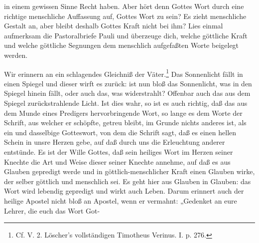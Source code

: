 in einem gewissen Sinne Recht haben. Aber hört denn Gottes Wort durch eine richtige menschliche Auffassung auf, Gottes Wort zu sein? Es zieht menschliche Gestalt an, aber bleibt deshalb Gottes Kraft nicht bei ihm? Lies einmal aufmerksam die Pastoralbriefe Pauli und überzeuge dich, welche göttliche Kraft und welche göttliche Segnungen dem menschlich aufgefaßten Worte beigelegt werden.

Wir erinnern an ein schlagendes Gleichniß der Väter.\footnote{Cf. V. 2. Löscher’s vollständigen Timotheus Verinus. I. p. 276.} Das Sonnenlicht fällt in einen Spiegel und dieser wirft es zurück: ist nun bloß das Sonnenlicht, was in den Spiegel hinein fällt, oder auch das, was widerstrahlt? Offenbar auch das aus dem Spiegel zurückstrahlende Licht. Ist dies wahr, so ist es auch richtig, daß das aus dem Munde eines Predigers hervorbringende Wort, so lange es dem Worte der Schrift, aus welcher er schöpfte, getreu bleibt, im Grunde nichts anderes ist, als ein und dasselbige Gotteswort, von dem die Schrift sagt, daß es einen hellen Schein in unsre Herzen gebe, auf daß durch uns die Erleuchtung anderer entstünde. Es ist der Wille Gottes, daß sein heiliges Wort im Herzen seiner Knechte die Art und Weise dieser seiner Knechte annehme, auf daß es aus Glauben gepredigt werde und in göttlich-menschlicher Kraft einen Glauben wirke, der selber göttlich und menschlich sei. Es geht hier aus Glauben in Glauben: das Wort wird lebendig gepredigt und wirkt auch Leben. Darum erinnert auch der heilige Apostel nicht bloß an Apostel, wenn er vermahnt: „Gedenket an eure Lehrer, die euch das Wort Got-
